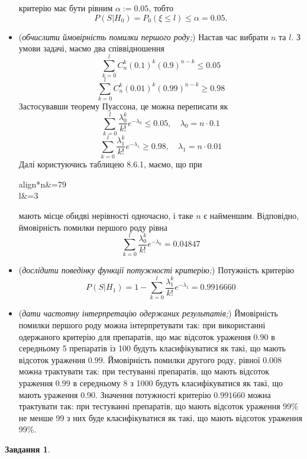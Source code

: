 \documentclass[12pt]{article} %
\newtheorem{prob}{Завдання}
\begin{document}
\begin{itemize}
			критерію має бути рівним $\alpha:=0.05$, тобто
			\[P(S\big| H_0)=P_0(\xi\leq l)\leq\alpha=0.05.\]
		\item (\textit{обчислити ймовірність помилки першого роду;})
			Настав час вибрати $n$ та $l$. З умови задачі, маємо два співвідношення
			\[\sum_{k=0}^lC_n^k(0.1)^k(0.9)^{n-k}\leq0.05\]
			\[\sum_{k=0}^lC_n^k(0.01)^k(0.99)^{n-k}\geq0.98\]
			Застосувавши теорему Пуассона, це можна переписати як
			\[\sum_{k=0}^l\frac{\lambda_0^k}{k!}e^{-\lambda_0}\leq0.05,\quad\lambda_0=n\cdot0.1\]
			\[\sum_{k=0}^l\frac{\lambda_1^k}{k!}e^{-\lambda_1}\geq0.98,\quad\lambda_1=n\cdot0.01\]
			Далі користуючись таблицею 8.6.1, маємо, що при 
			\begin{empheq}[box=\fbox]{align*}n&=79\\l&=3\end{empheq}
			мають місце обидві нерівності одночасно, і таке $n$ є найменшим. Відповідно, ймовірність помилки першого роду рівна
			\[\sum_{k=0}^l\frac{\lambda_0^k}{k!}e^{-\lambda_0}=0.04847\]
		\item (\textit{дослідити поведінку функції потужності критерію;})
			Потужність критерію
			\[P(S\big|H_1)=1-\sum_{k=0}^l\frac{\lambda_1^k}{k!}e^{-\lambda_1}=0.9916660\]
		\item (\textit{дати частотну інтерпретацію одержаних результатів;})
			Ймовірність помилки першого роду можна інтерпретувати так: при використанні одержаного критерію для препаратів, що
			має відсоток ураження $0.90$ в середньому 5 препаратів із 100 будуть класифікуватися як такі, що мають відсоток
			ураження $0.99$. Ймовірність помилки другого роду, рівної $0.008$ можна трактувати так: при тестуванні препаратів, що
			мають відсоток ураження $0.99$ в середньому 8 з 1000 будуть класифікуватися як такі, що мають ураження 0.90. Значення
			потужності критерію $0.991660$ можна трактувати так: при тестуванні препаратів, що мають відсоток ураження 99\%
			не менше 99 з них буде класифікуватися як такі, що мають відсоток ураження 99\%.
	\end{itemize}
\begin{prob}\end{prob}
\end{document}
